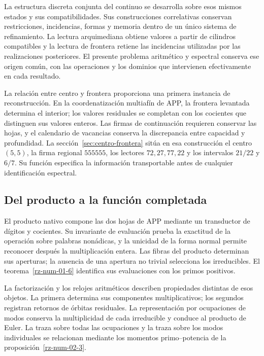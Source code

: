 La estructura discreta conjunta del continuo se desarrolla sobre
esos mismos estados y sus compatibilidades. Sus construcciones
correlativas conservan restricciones, incidencias, formas y
memoria dentro de un único sistema de refinamiento. La lectura
arquimediana obtiene valores a partir de cilindros compatibles y la lectura
de frontera retiene las incidencias utilizadas por las
realizaciones posteriores. El presente problema aritmético y
espectral conserva ese origen común, con las operaciones y los
dominios que intervienen efectivamente en cada resultado.

La relación entre centro y frontera proporciona una primera
instancia de reconstrucción. En la coordenatización multiafín de APP, la
frontera levantada determina el interior; los valores
residuales se completan con los cocientes que distinguen sus
valores enteros. Las firmas de continuación requieren conservar
las hojas, y el calendario de vacancias conserva la discrepancia
entre capacidad y profundidad. La
sección~\ref{sec:centro-frontera} sitúa en esa construcción el
centro $(5,5)$, la firma regional $555555$, los lectores
$72,27,77,22$ y los intervalos $21/22$ y $6/7$. Su función
especifica la información transportable antes de cualquier
identificación espectral.

\subsection*{Del producto a la función completada}

El producto nativo compone las dos hojas de APP mediante un
transductor de dígitos y cocientes. Su invariante de evaluación
prueba la exactitud de la operación sobre palabras nonádicas,
y la unicidad de la forma normal permite reconocer después la
multiplicación entera. Las fibras del producto determinan sus
aperturas; la ausencia de una apertura no trivial selecciona
los irreducibles. El teorema~\ref{rz-num-01-6} identifica sus
evaluaciones con los primos positivos.

La factorización y los relojes aritméticos describen propiedades
distintas de esos objetos. La primera determina sus componentes
multiplicativos; los segundos registran retornos de órbitas
residuales. La representación por ocupaciones de modos conserva
la multiplicidad de cada irreducible y conduce al producto de
Euler. La traza sobre todas las ocupaciones y la traza sobre
los modos individuales se relacionan mediante los momentos
primo--potencia de la proposición~\ref{rz-num-02-3}.

